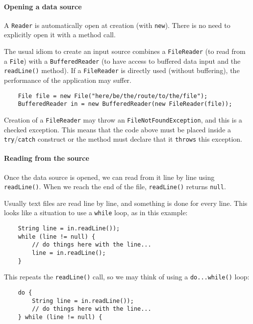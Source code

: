 \paragraph{Opening a data source}
\label{sec:open-data-source}

A \verb+Reader+ is automatically open at creation (with
\verb+new+). There is no need to explicitly open it with a method
call. 

The usual idiom to create an input source
combines a \verb+FileReader+ (to read from a
\verb+File+) with a \verb+BufferedReader+ (to have access to buffered
data input and the \verb+readLine()+ method). If a \verb+FileReader+ is
directly used (without buffering), the performance of the application
may suffer. 

\begin{verbatim}
    File file = new File("here/be/the/route/to/the/file");
    BufferedReader in = new BufferedReader(new FileReader(file)); 
\end{verbatim}

Creation of a \verb+FileReader+ may throw an
\verb+FileNotFoundException+, and this is a checked exception. This
means that the code above must be placed inside a \verb+try+/\verb+catch+
construct or the method must declare that it \verb+throws+ this
exception. 

\paragraph{Reading from the source}
\label{sec:reading-from-source}

Once the data source is opened, we can read from it line by line using
\verb+readLine()+. When we reach the end of the file,
\verb+readLine()+ returns \verb+null+. 

Usually text files are read line by line, and something is done 
for every line. This looks like a situation to use a \verb+while+
loop, as in this example:

\begin{verbatim}
    String line = in.readLine());
    while (line != null) {
        // do things here with the line...
        line = in.readLine();
    }
\end{verbatim}

This repeats the \verb+readLine()+ call, so we may think of using a
\verb+do...while()+ loop: 

\begin{verbatim}
    do {
        String line = in.readLine());
        // do things here with the line...
    } while (line != null) {
\end{verbatim}

